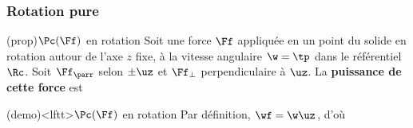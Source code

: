 \documentclass[../../main/main.tex]{subfiles}
\begin{document}
\subsubsection{Rotation pure}
\begin{tcb*}(prop){$\Pc(\protect\Ff)$ en rotation}
	Soit une force $\Ff$ appliquée en un point du solide en rotation autour de
	l'axe $z$ fixe, à la vitesse angulaire $\w = \tp$ dans le référentiel $\Rc$.
	Soit $\Ff_{\parr}$ selon $\pm \uz$ et $\Ff_{\perp}$ perpendiculaire à $\uz$.
	La \textbf{puissance de cette force} est
	\psw{
		\[
			\boxed{\Pc\ind{rot}(\Ff) = \Mcf_{\Or}(\Ff) \cdot \wf = \Mc_{\D}\w(t)}
		\]
	}
	\vspace{-15pt}
\end{tcb*}
\begin{tcb*}[sidebyside, righthand ratio=.4](demo)<lftt>{$\Pc(\protect\Ff)$ en rotation}
	Par définition, $\wf = \w \uz$, d'où
	\tcblower
	\begin{center}
\end{center}
\end{tcb*}
\end{document}

